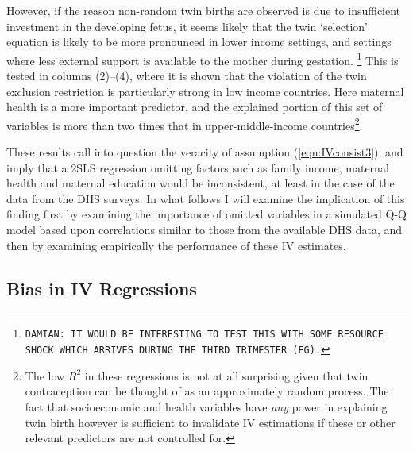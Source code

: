 \documentclass{article}[11pt,subeqn]
\begin{document}
\begin{spacing}{1.5}
However, if the reason non-random twin births are observed is due to insufficient investment in the developing fetus, it seems likely that
the twin `selection' equation is likely to be more pronounced in lower income settings, and settings where less external support is available
to the mother during gestation. \footnote{\texttt{DAMIAN: IT WOULD BE INTERESTING TO TEST THIS WITH SOME RESOURCE SHOCK WHICH ARRIVES DURING
THE THIRD TRIMESTER (EG).}}  This is tested in columns (2)--\textbf{}(4), where it is shown that the violation of the twin exclusion restriction is particularly
strong in low income countries.  Here maternal health is a more important predictor, and the explained portion of this set of variables is more than
two times that in upper-middle-income countries\footnote{The low $R^2$ in these regressions is not at all surprising given that twin contraception
can be thought of as an approximately random process.  The fact that socioeconomic and health variables have \emph{any} power in explaining
twin birth however is sufficient to invalidate IV estimations if these or other relevant predictors are not controlled for.}.

These results call into question the veracity of assumption (\ref{eqn:IVconsist3}), and imply that a 2SLS regression omitting factors such as family
income, maternal health and maternal education would be inconsistent, at least in the case of the data from the DHS surveys.  In what follows
I will examine the implication of this finding first by examining the importance of omitted variables in a simulated Q-Q model based upon
correlations similar to those from the available DHS data, and then by examining empirically the performance of these IV estimates.  
\subsection{Bias in IV Regressions}
\label{scn:bias}

\end{spacing}
\end{document}
